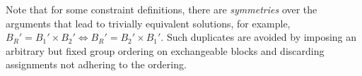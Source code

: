 \documentclass{IEEEtran}
\newcommand{\samuel}[1]{\textcolor{green}{{\sc Samuel:} #1}\xspace}
\newcommand{\tias}[1]{\textcolor{blue}{{\sc Tias:} #1}\xspace}
\newcommand{\eccalc}[2]{\ensuremath{#1 = #2}}
\newcommand{\ecprod}[3]{\eccalc{#1}{#2 \times #3}}
\theoremstyle{definition}
\begin{document}

Note that for some constraint definitions, there are \textit{symmetries} over the arguments that lead to trivially equivalent solutions, for example, $\ecprod{B_R'}{B_1'}{B_2'} \Leftrightarrow \ecprod{B_R'}{B_2'}{B_1'}$.
Such duplicates are avoided by imposing an arbitrary but fixed group ordering on exchangeable blocks and discarding assignments not adhering to the ordering.



\end{document}
